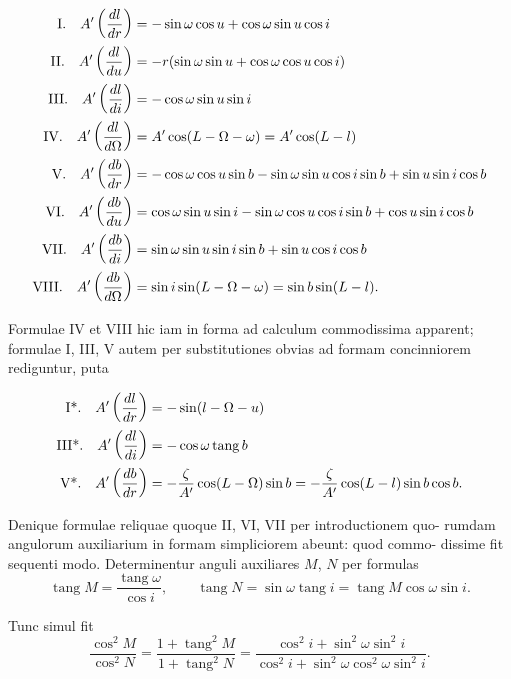 \documentclass[12pt,a4paper]{article}
\newcommand{\tang}{\mathop{\mathrm{tang}}\nolimits}
\begin{document}
\begin{align*}
\text{I.\quad} A'\left(\frac{dl}{dr}\right) &= -\sin\omega\cos u + \cos\omega\sin u\cos i \\
\text{II.\quad} A'\left(\frac{dl}{du}\right) &= -r(\sin\omega\sin u + \cos\omega\cos u\cos i) \\
\text{III.\quad} A'\left(\frac{dl}{di}\right) &= -\cos\omega\sin u\sin i \\
\text{IV.\quad} A'\left(\frac{dl}{d\Omega}\right) &= A'\cos(L - \Omega - \omega) = A'\cos(L - l) \\
\text{V.\quad} A'\left(\frac{db}{dr}\right) &= -\cos\omega\cos u\sin b - \sin\omega\sin u\cos i\sin b + \sin u\sin i\cos b \\
\text{VI.\quad} A'\left(\frac{db}{du}\right) &= \cos\omega\sin u\sin i - \sin\omega\cos u\cos i\sin b + \cos u\sin i\cos b \\
\text{VII.\quad} A'\left(\frac{db}{di}\right) &= \sin\omega\sin u\sin i\sin b + \sin u\cos i\cos b \\
\text{VIII.\quad} A'\left(\frac{db}{d\Omega}\right) &= \sin i\sin(L - \Omega - \omega) = \sin b\sin(L - l).
\end{align*}

Formulae IV et VIII hic iam in forma ad calculum commodissima apparent;
formulae I, III, V autem per substitutiones obvias ad formam concinniorem
rediguntur, puta

\begin{align*}
\text{I*.\quad} A'\left(\frac{dl}{dr}\right) &= -\sin(l - \Omega - u) \\
\text{III*.\quad} A'\left(\frac{dl}{di}\right) &= -\cos\omega\tang b \\
\text{V*.\quad} A'\left(\frac{db}{dr}\right) &= -\frac{\zeta}{A'}\cos(L - \Omega)\sin b = -\frac{\zeta}{A'}\cos(L - l)\sin b\cos b.
\end{align*}

Denique formulae reliquae quoque II, VI, VII per introductionem quo-
rumdam angulorum auxiliarium in formam simpliciorem abeunt: quod commo-
dissime fit sequenti modo. Determinentur anguli auxiliares $M$, $N$ per formulas
\[
\tang M = \frac{\tang\omega}{\cos i}, \qquad \tang N = \sin\omega\tang i = \tang M\cos\omega\sin i.
\]

Tunc simul fit
\[
\frac{\cos^2 M}{\cos^2 N} = \frac{1 + \tang^2 M}{1 + \tang^2 N} = \frac{\cos^2 i + \sin^2\omega\sin^2 i}{\cos^2 i + \sin^2\omega\cos^2\omega\sin^2 i}.
\]
\end{document}
